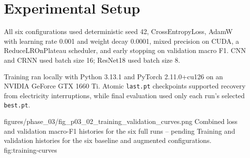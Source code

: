 \section{Experimental Setup}

All six configurations used deterministic seed 42, CrossEntropyLoss, AdamW
with learning rate 0.001 and weight decay 0.0001, mixed precision on CUDA, a
ReduceLROnPlateau scheduler, and early stopping on validation macro F1.
CNN and CRNN used batch size 16; ResNet18 used batch size 8.

Training ran locally with Python 3.13.1 and PyTorch 2.11.0+cu126 on an NVIDIA
GeForce GTX 1660 Ti. Atomic \texttt{last.pt} checkpoints supported recovery
from electricity interruptions, while final evaluation used only each run's
selected \texttt{best.pt}.

\ProjectFigure
  {figures/phase_03/fig_p03_02_training_validation_curves.png}
  {\columnwidth}
  {Combined loss and validation macro-F1 histories for the six full runs --
  pending}
  {Training and validation histories for the six baseline and augmented
  configurations.}
  {fig:training-curves}

